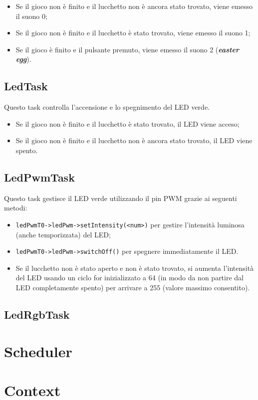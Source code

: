 \begin{itemize}
	\item Se il gioco non è finito e il lucchetto non è ancora stato trovato, viene emesso il suono 0;
	\item Se il gioco non è finito e il lucchetto è stato trovato, viene emesso il suono 1;
	\item Se il gioco è finito e il pulsante premuto, viene emesso il suono 2 (\textbf{\textit{easter egg}}).
\end{itemize}

\subsection{LedTask}
Questo task controlla l'accensione e lo spegnimento del LED verde.

\begin{itemize}
	\item Se il gioco non è finito e il lucchetto è stato trovato, il LED viene acceso;
	\item Se il gioco non è finito e il lucchetto non è ancora stato trovato, il LED viene spento.
\end{itemize}

\subsection{LedPwmTask}
Questo task gestisce il LED verde utilizzando il pin PWM grazie ai seguenti metodi:
\begin{itemize}
	\item \texttt{ledPwmT0->ledPwm->setIntensity(<num>)} per gestire l'intensità luminosa (anche temporizzata) del LED;
	\item \texttt{ledPwmT0->ledPwm->switchOff()} per spegnere immediatamente il LED.
\end{itemize}
\begin{itemize}
	\item Se il lucchetto non è stato aperto e non è stato trovato, si aumenta l'intensità del LED usando un ciclo for inizializzato a 64 (in modo da non partire dal LED completamente spento) per arrivare a 255 (valore massimo consentito).
\end{itemize}

\subsection{LedRgbTask}


\section{Scheduler}

\section{Context}\label{sec:context}




